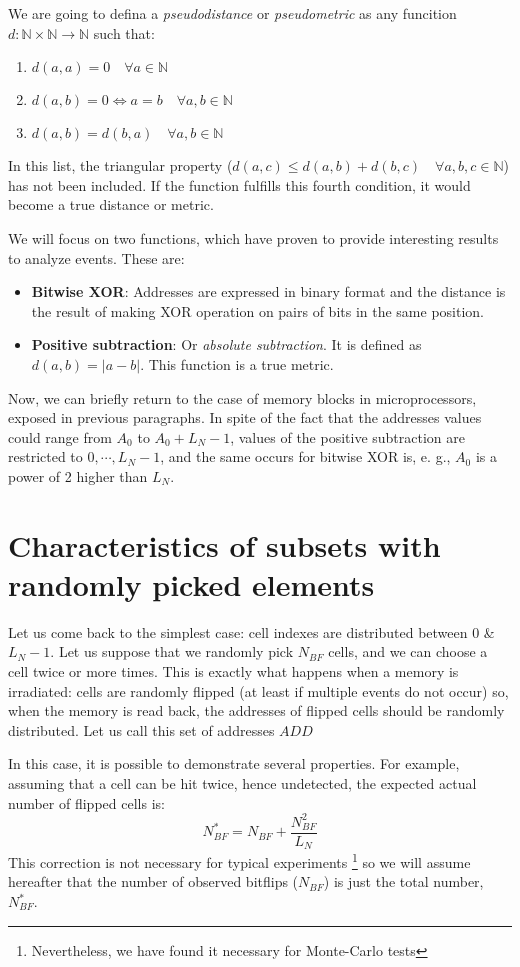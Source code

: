 We are going to defina a \textit{pseudodistance} or \textit{pseudometric} as any funcition \(d:\mathbb{N} \times \mathbb{N} \rightarrow \mathbb{N}\) such that:
%
\begin{enumerate}
	\item \(d(a, a) = 0\quad\forall a \in \mathbb{N}\)
	\item \(d(a, b) = 0\Leftrightarrow a = b \quad\forall a, b \in \mathbb{N}\)
	\item \(d(a, b) = d(b, a) \quad\forall a, b \in \mathbb{N}\)
\end{enumerate}
%
In this list, the triangular property (\(d(a,c) \le d(a, b)+d(b,c) \quad\forall a, b, c \in \mathbb{N}\)) has not been included. If the function fulfills this fourth condition, it would become a true distance or metric.

We will focus on two functions, which have proven to provide interesting results to analyze events. These are:
%
\begin{itemize}
	\item \textbf{Bitwise XOR}: Addresses are expressed in binary format and the distance is the result of making XOR operation on pairs of bits in the same position.
	\item \textbf{Positive subtraction}:  Or \textit{absolute subtraction}. It is defined as \(d(a, b)=\left|a-b\right|\). This function is a true metric.
\end{itemize}
%
Now, we can briefly return to the case of memory blocks in microprocessors, exposed in previous paragraphs. In spite of the fact that the addresses values could range from \(A_0\) to \(A_0+L_N-1\), values of the positive subtraction are restricted to \(0,\cdots, L_N-1\), and the same occurs for bitwise XOR is, e. g., \(A_0\) is a power of 2 higher than \(L_N\).
%
\section{Characteristics of subsets with randomly picked elements}
%
Let us come back to the simplest case: cell indexes are distributed between \(0\) \& \(L_N-1\). Let us suppose that we randomly pick \(N_{BF}\) cells, and we can choose a cell twice or more times. This is exactly what happens when a memory is irradiated: cells are randomly flipped (at least if multiple events do not occur) so, when the memory is read back, the addresses of flipped cells should be randomly distributed. Let us call this set of addresses \(ADD\)

In this case, it is possible to demonstrate several properties. For example, assuming that a cell can be hit twice, hence undetected, the expected actual number of flipped cells is:
\begin{equation}
	N_{BF}^* = N_{BF}+\frac{N_{BF}^2}{L_N}
	\label{Eq:ActualNumberOfBF}
\end{equation}
This correction is not necessary for typical experiments \footnote{Nevertheless, we have found it necessary for Monte-Carlo tests} so we will assume hereafter that the number of observed bitflips (\(N_{BF}\)) is just the total number, \(N_{BF}^*\). 

